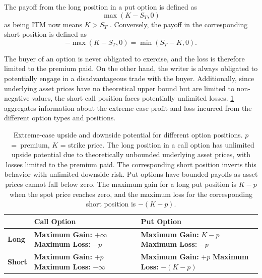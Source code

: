 \documentclass[english,12pt,a4paper,pdftex,sci,utf8]{aaltothesis}
\begin{document}
The payoff from the long position in a put option is defined as
\begin{equation}
    \max(K-S_T,0)
\label{eq:long_put_payoff}
\end{equation}
as being ITM now means $K > S_T$ \cite{hull2016options}. Conversely, the payoff in the corresponding short position is defined as
\begin{equation*}
    -\max(K-S_T,0) = \min(S_T-K,0).
\end{equation*}


The buyer of an option is never obligated to exercise, and the loss is therefore limited to the premium paid. On the other hand, the writer is always obligated to potentially engage in a disadvantageous trade with the buyer. Additionally, since underlying asset prices have no theoretical upper bound but are limited to non-negative values, the short call position faces potentially unlimited losses. \cref{tab:options_table} aggregates information about the extreme-case profit and loss incurred from the different option types and positions.

\begin{table}[!htb]
\centering
\caption{Extreme-case upside and downside potential for different option positions. \mbox{$p$ = premium}, $K$ = strike price. The long position in a call option has unlimited upside potential due to theoretically unbounded underlying asset prices, with losses limited to the premium paid. The corresponding short position inverts this behavior with unlimited downside risk. Put options have bounded payoffs as asset prices cannot fall below zero. The maximum gain for a long put position is $K-p$ when the spot price reaches zero, and the maximum loss for the corresponding short position is $-(K-p)$.}\label{tab:options_table}
\begin{tabular}{|l|p{5cm}|p{5cm}|}
\hline
\textbf{} & \textbf{Call Option} & \textbf{Put Option} \\
\hline
\textbf{Long} & \textbf{Maximum Gain:} $+\infty$
\newline \textbf{Maximum Loss:} $-p$ & \textbf{Maximum Gain:} $K-p$
\newline \textbf{Maximum Loss:} $-p$ \\
\hline
\textbf{Short} & \textbf{Maximum Gain:} $+p$
\newline \textbf{Maximum Loss:} $-\infty$ & \textbf{Maximum Gain:} $+p$
\newline \textbf{Maximum Loss:} $-(K-p)$ \\
\hline
\end{tabular}
\end{table}
\end{document}
